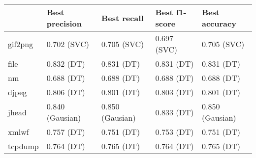 \begin{tabular}{lllll}
\toprule
{} &        Best precision &           Best recall &         Best f1-score &         Best accuracy \\
\midrule
gif2png &           0.702 (SVC) &           0.705 (SVC) &           0.697 (SVC) &           0.705 (SVC) \\
file    &  0.832 (DT) &  0.831 (DT) &  0.831 (DT) &  0.831 (DT) \\
nm      &  0.688 (DT) &  0.688 (DT) &  0.688 (DT) &  0.688 (DT) \\
djpeg   &  0.806 (DT) &  0.801 (DT) &  0.803 (DT) &  0.801 (DT) \\
jhead   &       0.840 (Gausian) &       0.850 (Gausian) &  0.833 (DT) &       0.850 (Gausian) \\
xmlwf   &  0.757 (DT) &  0.751 (DT) &  0.753 (DT) &  0.751 (DT) \\
tcpdump &  0.764 (DT) &  0.765 (DT) &  0.764 (DT) &  0.765 (DT) \\
\bottomrule
\end{tabular}

